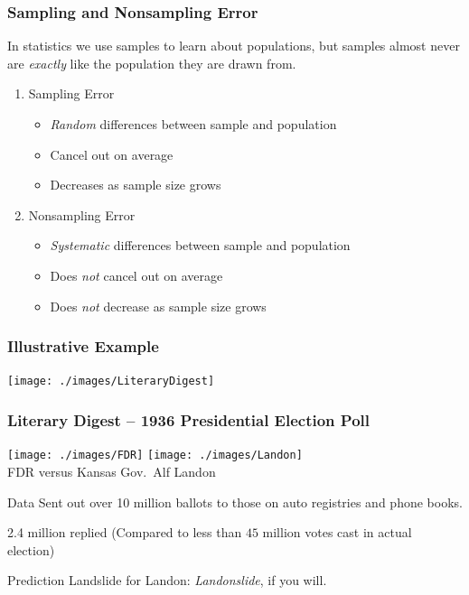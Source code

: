 \documentclass[handout]{beamer}
\begin{document}
\begin{frame}
\frametitle{Sampling and Nonsampling Error}
In statistics we use samples to learn about populations, but samples almost never are \emph{exactly} like the population they are drawn from.
	\begin{enumerate}
		\item Sampling Error 
			\begin{itemize}
				\item \emph{Random} differences between sample and population
				\item Cancel out on average
				\item Decreases as sample size grows
			\end{itemize}
		\item Nonsampling Error
			\begin{itemize}
				\item \emph{Systematic} differences between sample and population 
				\item Does \emph{not} cancel out on average
				\item Does \emph{not} decrease as sample size grows
			\end{itemize}
	\end{enumerate}
\end{frame}

\begin{frame}
\frametitle{Illustrative Example}
	\begin{center}
		\texttt{[image: ./images/LiteraryDigest]}
	\end{center}
\end{frame}

\begin{frame}
\frametitle{Literary Digest -- 1936 Presidential Election Poll}
	\begin{center}
		\texttt{[image: ./images/FDR]}
		\texttt{[image: ./images/Landon]}\\
		\small FDR versus Kansas Gov.\ Alf Landon
	\end{center}
	\normalsize

	\begin{block}{Data}
		Sent out over 10 million ballots to those on auto registries and phone books. 
		
		2.4 million replied (Compared to  less than $45$ million votes cast in actual election)
	\end{block}
	
	\begin{block}{Prediction}
		Landslide for Landon: \emph{Landonslide},  if you will.
	\end{block}
\end{frame}
\end{document}
